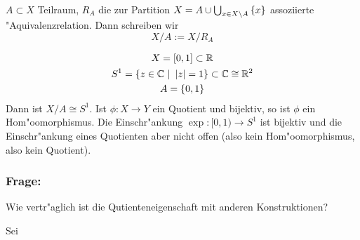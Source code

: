 \begin{dfn}
 $A\subset X$ Teilraum, $R_A$ die zur Partition $X=A\cup \bigcup_{x\in X\setminus A}
 \mdef{x}$ assoziierte "Aquivalenzrelation. Dann schreiben wir
 \[
  X/A := X/R_A
 \]
 \begin{bsp}
  \begin{gather}
   X = [0,1]\subset \R \\
   S^1 = \mdef[z\in\C]{\left|z\right|=1}\subset \C \cong \R^2 \\
   A = \mdef{0,1}
  \end{gather}
  Dann ist $X/A \cong S^1$. Ist $\phi:X\to Y$ ein Quotient und bijektiv, so ist
  $\phi$ ein Hom"oomorphismus. Die Einschr"ankung $\exp : [0,1) \to S^1$ ist
  bijektiv und die Einschr"ankung eines Quotienten aber nicht offen (also kein
  Hom"oomorphismus, also kein Quotient).

  \subsubsection*{Frage:} Wie vertr"aglich ist die Qutienteneigenschaft mit
  anderen Konstruktionen?
 \end{bsp}
\end{dfn}

\begin{dfn}
 Sei 
\end{dfn}

